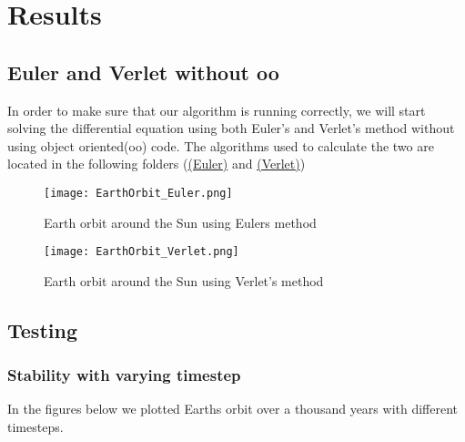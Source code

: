 \documentclass[../main.tex]{subfiles}
\begin{document}
\section{Results}\label{results}
\subsection{Euler and Verlet without oo}
In order to make sure that our algorithm is running correctly, we will start solving the differential equation using both Euler's and Verlet's method without using object oriented(oo) code. The algorithms used to calculate the two are located in the following folders (\href{https://github.com/kmaasrud/Project-5/tree/master/code/Earth-Sun_Euler-FWD}{(Euler)} and \href{https://github.com/kmaasrud/Project-5/tree/master/code/Earth-Sun_Verlet}{(Verlet)})

\begin{figure}[!h]
  \centering
  \parbox{5cm}{
  \texttt{[image: EarthOrbit\_Euler.png]}
  \caption{Earth orbit around the Sun using Eulers method}
  \label{fig:EarthOrbit_Euler}}
  \qquad
  \begin{minipage}{5cm}
    \texttt{[image: EarthOrbit\_Verlet.png]}
    \caption{Earth orbit around the Sun using Verlet's method}
    \label{fig:EarthOrbit_Verlet}
  \end{minipage}
  \end{figure}
\FloatBarrier




\subsection{Testing}
\subsubsection{Stability with varying timestep} \label{sec:results-test-timestep}
In the figures below we plotted Earths orbit over a thousand years with different timesteps.
\end{document}
